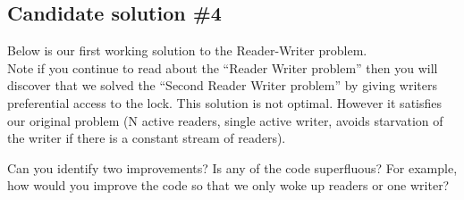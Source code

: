 \subsection{Candidate solution \#4}\label{candidate-solution-4}

Below is our first working solution to the Reader-Writer problem.\\Note
if you continue to read about the ``Reader Writer problem'' then you
will discover that we solved the ``Second Reader Writer problem'' by
giving writers preferential access to the lock. This solution is not
optimal. However it satisfies our original problem (N active readers,
single active writer, avoids starvation of the writer if there is a
constant stream of readers).

Can you identify two improvements? Is any of the code superfluous? For
example, how would you improve the code so that we only woke up readers
or one writer?

\begin{Shaded}
\begin{Highlighting}[]
     
     


\NormalTok{\}}

     
\NormalTok{\}}
\end{Highlighting}
\end{Shaded}

